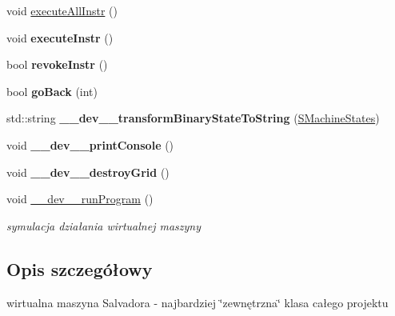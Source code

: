 \begin{CompactItemize}
\item 
void \hyperlink{classSVirtualMachine_f3874f10dac15f27b23dc4b976271413}{executeAllInstr} ()
\item 
\hypertarget{classSVirtualMachine_200c4aae4eedf52ba7a3754295505186}{
void \textbf{executeInstr} ()}
\label{classSVirtualMachine_200c4aae4eedf52ba7a3754295505186}

\item 
\hypertarget{classSVirtualMachine_2a2a23e279ef7df99fbcdd798a5385cf}{
bool \textbf{revokeInstr} ()}
\label{classSVirtualMachine_2a2a23e279ef7df99fbcdd798a5385cf}

\item 
\hypertarget{classSVirtualMachine_c8d0c7a837c157b0a1efaf80ffeee486}{
bool \textbf{goBack} (int)}
\label{classSVirtualMachine_c8d0c7a837c157b0a1efaf80ffeee486}

\item 
\hypertarget{classSVirtualMachine_f8e1ef67bff80a4ce0aa7afc741a1a93}{
std::string \textbf{\_\-\_\-dev\_\-\_\-transformBinaryStateToString} (\hyperlink{senums_8h_c31b206c0c7cd52b9a0b18204f373c7e}{SMachineStates})}
\label{classSVirtualMachine_f8e1ef67bff80a4ce0aa7afc741a1a93}

\item 
\hypertarget{classSVirtualMachine_21b1ac24c7018fd084a553a66f5827ea}{
void \textbf{\_\-\_\-dev\_\-\_\-printConsole} ()}
\label{classSVirtualMachine_21b1ac24c7018fd084a553a66f5827ea}

\item 
\hypertarget{classSVirtualMachine_cf39eaf295cf709c43b8754aed84286f}{
void \textbf{\_\-\_\-dev\_\-\_\-destroyGrid} ()}
\label{classSVirtualMachine_cf39eaf295cf709c43b8754aed84286f}

\item 
void \hyperlink{classSVirtualMachine_d07f353daaf626f5efeb8bd34818db75}{\_\-\_\-dev\_\-\_\-runProgram} ()
\begin{CompactList}\small\item\em symulacja działania wirtualnej maszyny \item\end{CompactList}\end{CompactItemize}


\subsection{Opis szczegółowy}
wirtualna maszyna Salvadora - najbardziej \char`\"{}zewnętrzna\char`\"{} klasa całego projektu 

